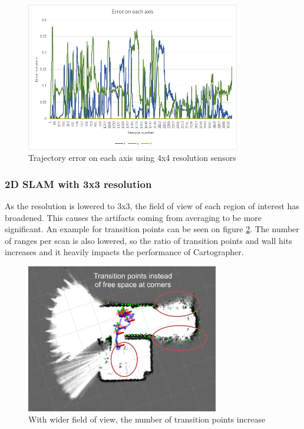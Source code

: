 \begin{figure}[!h]
    \centering
	\includegraphics[height=65mm, keepaspectratio]{figures/02_trajectory_error.png}
    \caption{Trajectory error on each axis using 4x4 resolution sensors}
    \label{fig:02_trajectory_error}
\end{figure}







\subsubsection{2D SLAM with 3x3 resolution}
As the resolution is lowered to 3x3, the field of view of each region of interest has broadened.
This causes the artifacts coming from averaging to be more significant. An example for transition 
points can be seen on figure \ref{fig:03_artifacts}. The number of ranges per scan is also lowered,
so the ratio of transition points and wall hits increases and it heavily impacts the performance of
Cartographer.

\begin{figure}[!h]
    \centering
	\includegraphics[height=65mm, keepaspectratio]{figures/03_artifacts.png}
    \caption{With wider field of view, the number of transition points increase}
    \label{fig:03_artifacts}
\end{figure}

